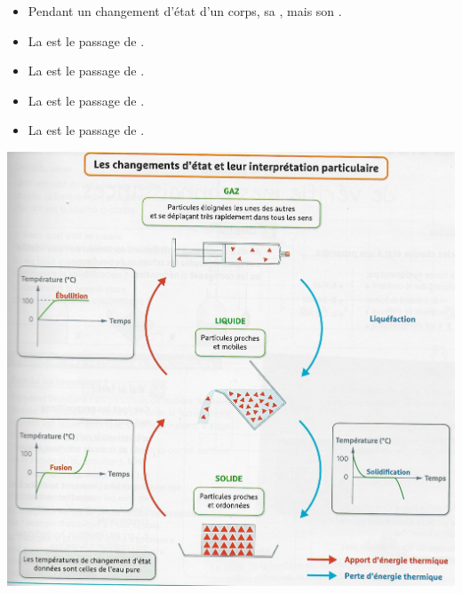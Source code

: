 \begin{mybilan}
	\begin{itemize}
		\item Pendant un changement d'état d'un corps, sa , mais son .
		\item La  est le passage de .
		\item La  est le passage de .
		\item La  est le passage de .
		\item La  est le passage de .
		
	\end{itemize}

	\begin{center}
		\includegraphics[scale=0.7]{img/chgmt_etats}
	\end{center}
\end{mybilan}